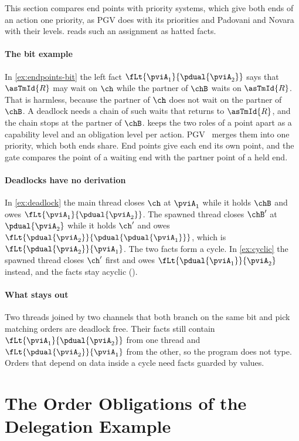 This section compares end points with priority systems, which give both
ends of an action one priority, as PGV does with its priorities and
Padovani and Novara with their levels.  reads such
an assignment as hatted facts.

\paragraph{The bit example}
In \cref{ex:endpoints-bit} the left fact
$\fLt{\pviA_1}{\pdual{\pviA_2}}$ says that $\asTmId{R}$ may wait on
$\ch$ while the partner of $\chB$ waits on $\asTmId{R}$. That is
harmless, because the partner of $\ch$ does not wait on the partner of
$\chB$. A deadlock needs a chain of such waits that returns to
$\asTmId{R}$, and the chain stops at the partner of $\chB$.
\citet{Kobayashi06} keeps the two roles of a point apart as a capability
level and an obligation level per action. PGV~\cite{KokkeD23} merges
them into one priority, which both ends share. End points give each end
its own point, and the gate compares the point of a waiting end with the
partner point of a held end.

\paragraph{Deadlocks have no derivation}
In \cref{ex:deadlock} the main thread closes $\ch$ at $\pviA_1$ while it
holds $\chB$ and owes $\fLt{\pviA_1}{\pdual{\pviA_2}}$. The spawned
thread closes $\chB'$ at $\pdual{\pviA_2}$ while it holds $\ch'$ and owes
$\fLt{\pdual{\pviA_2}}{\pdual{\pdual{\pviA_1}}}$, which is
$\fLt{\pdual{\pviA_2}}{\pviA_1}$. The two facts form a cycle. In
\cref{ex:cyclic} the spawned thread closes $\ch'$ first and owes
$\fLt{\pdual{\pviA_1}}{\pviA_2}$ instead, and the facts stay acyclic
().

\paragraph{What stays out}
Two threads joined by two channels that both branch on the same bit and
pick matching orders are deadlock free. Their facts still contain
$\fLt{\pviA_1}{\pdual{\pviA_2}}$ from one thread and
$\fLt{\pdual{\pviA_2}}{\pviA_1}$ from the other, so the program does not
type. Orders that depend on data inside a cycle need facts guarded by
values.



\section{The Order Obligations of the Delegation Example}
\label{sec:app-delegation}

